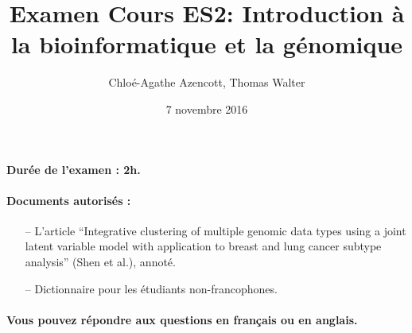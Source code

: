 \documentclass[11pt,addpoints]{exam}
\title{Examen Cours ES2: Introduction à la bioinformatique et la génomique}
\author{Chloé-Agathe Azencott, Thomas Walter}
\date{7 novembre 2016}
\begin{document}
\maketitle 

\paragraph{Dur\'ee de l'examen : 2h.} 

\paragraph{Documents autoris\'es :} 
\begin{itemize}
\item[--] L'article ``Integrative clustering of multiple genomic data types using a joint latent variable model with application to breast and lung cancer subtype analysis'' (Shen et al.), annoté.
\item[--] Dictionnaire pour les \'etudiants non-francophones.
\end{itemize}

\paragraph{Vous pouvez r\'epondre aux questions en français ou en anglais.}
\end{document}
